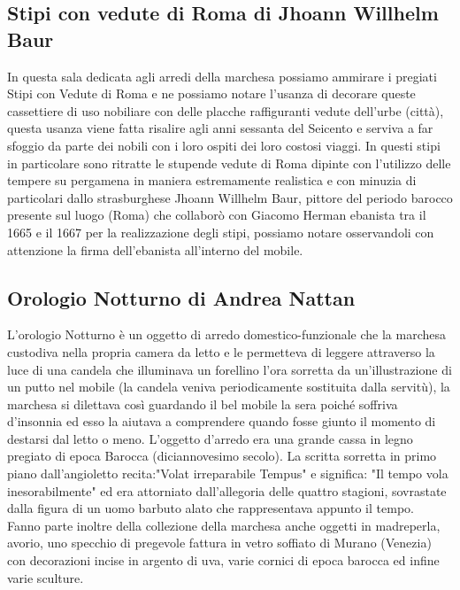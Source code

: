 \documentclass[hidelinks,12pt,a4paper]{article}
\begin{document}
\begin{flushleft}
		\subsection{Stipi con vedute di Roma di Jhoann Willhelm Baur}
		In questa sala dedicata agli arredi della marchesa possiamo ammirare i pregiati Stipi con Vedute di Roma e ne possiamo notare l'usanza di decorare queste cassettiere di uso nobiliare con delle placche raffiguranti vedute dell'urbe (città), questa usanza viene fatta risalire agli anni sessanta del Seicento e serviva a far sfoggio da parte dei nobili con i loro ospiti dei loro costosi viaggi. In questi stipi in particolare sono ritratte le stupende vedute di Roma dipinte con l'utilizzo delle tempere su pergamena in maniera estremamente realistica e con minuzia di particolari dallo strasburghese Jhoann Willhelm Baur, pittore del periodo barocco presente sul luogo (Roma) che collaborò con Giacomo Herman ebanista tra il 1665 e il 1667 per la realizzazione degli stipi, possiamo notare osservandoli con attenzione la firma dell'ebanista all'interno del mobile.
		
		\subsection{Orologio Notturno di Andrea Nattan}
		L'orologio Notturno è un oggetto di arredo domestico-funzionale che la marchesa custodiva nella propria camera da letto e le permetteva di leggere attraverso la luce di una candela che illuminava un forellino l'ora sorretta da un'illustrazione di un putto nel mobile (la candela veniva periodicamente sostituita dalla servitù), la marchesa si dilettava così guardando il bel mobile la sera poiché soffriva d'insonnia ed esso la aiutava a comprendere quando fosse giunto il momento di destarsi dal letto o meno. L'oggetto d'arredo era una grande cassa in legno pregiato di epoca Barocca (diciannovesimo secolo). La scritta sorretta in primo piano dall'angioletto recita:"Volat irreparabile Tempus" e significa: "Il tempo vola inesorabilmente" ed era attorniato dall'allegoria delle quattro stagioni, sovrastate dalla figura di un uomo barbuto alato che rappresentava appunto il tempo.\\
		Fanno parte inoltre della collezione della marchesa anche oggetti in madreperla, avorio, uno specchio di pregevole fattura in vetro soffiato di Murano (Venezia) con decorazioni incise in argento di uva, varie cornici di epoca barocca ed infine varie sculture.
		

\end{flushleft}
\end{document}
